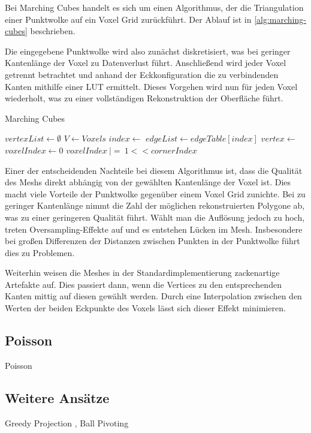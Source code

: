 Bei Marching Cubes \cite{lorensen1987marching} handelt es sich um einen Algorithmus, der die Triangulation einer Punktwolke auf ein Voxel Grid zurückführt.
Der Ablauf ist in \autoref{alg:marching-cubes} beschrieben.

Die eingegebene Punktwolke wird also zunächst diskretisiert, was bei geringer Kantenlänge der Voxel zu Datenverlust führt.
Anschließend wird jeder Voxel getrennt betrachtet und anhand der Eckkonfiguration die zu verbindenden Kanten mithilfe einer \ac{LUT} ermittelt.
Dieses Vorgehen wird nun für jeden Voxel wiederholt, was zu einer vollständigen Rekonstruktion der Oberfläche führt.

\begin{algorithm}[ht]
\caption{Marching Cubes}
\label{alg:marching-cubes}
\begin{algorithmic}
	\State $vertexList \gets \emptyset$
	\State $V \gets Voxels$
		\State $index \gets$ 
		\State $edgeList \gets edgeTable[index]$
			\State $vertex \gets$ 
			\State {}
		\EndFor
	\EndFor
\EndFunction
{}
	\State $voxelIndex \gets 0$
			\State $voxelIndex\ |=\ 1 << cornerIndex$
		\EndIf
	\EndFor
	\State {}
\EndFunction
\end{algorithmic}
\end{algorithm}

Einer der entscheidenden Nachteile bei diesem Algorithmus ist, dass die Qualität des Meshs direkt abhängig von der gewählten Kantenlänge der Voxel ist.
Dies macht viele Vorteile der Punktwolke gegenüber einem Voxel Grid zunichte.
Bei zu geringer Kantenlänge nimmt die Zahl der möglichen rekonstruierten Polygone ab, was zu einer geringeren Qualität führt.
Wählt man die Auflösung jedoch zu hoch, treten Oversampling-Effekte auf und es entstehen Lücken im Mesh.
Insbesondere bei großen Differenzen der Distanzen zwischen Punkten in der Punktwolke führt dies zu Problemen.

Weiterhin weisen die Meshes in der Standardimplementierung zackenartige Artefakte auf.
Dies passiert dann, wenn die Vertices zu den entsprechenden Kanten mittig auf diesen gewählt werden.
Durch eine Interpolation zwischen den Werten der beiden Eckpunkte des Voxels lässt sich dieser Effekt minimieren.


\subsection{Poisson}
\label{subsec:poisson}

Poisson \cite{kazhdan2006poisson}


\subsection{Weitere Ansätze}
\label{subsec:triangulation-others}
Greedy Projection \cite{Marton09ICRA},
Ball Pivoting \cite{bernardini1999ball}

